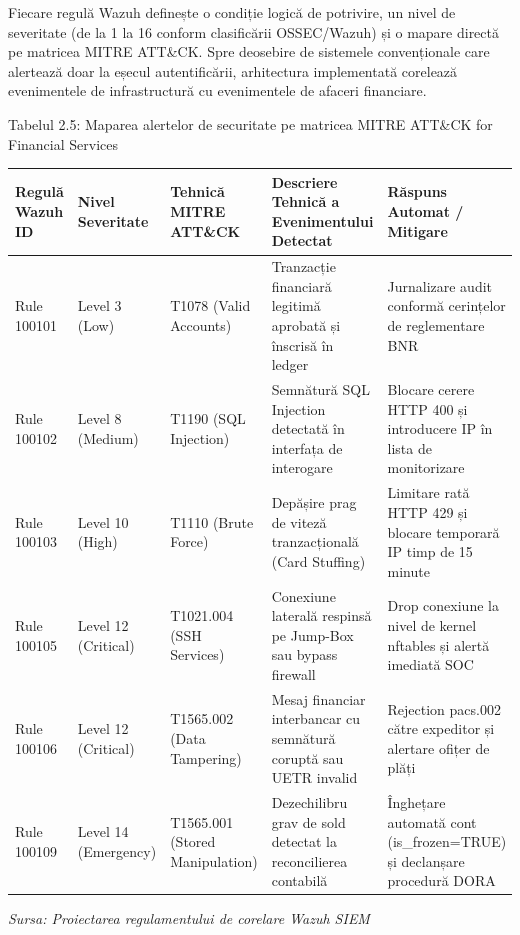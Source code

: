 Fiecare regulă Wazuh definește o condiție logică de potrivire, un nivel de severitate (de la 1 la 16 conform clasificării OSSEC/Wazuh) și o mapare directă pe matricea MITRE ATT\&CK. Spre deosebire de sistemele convenționale care alertează doar la eșecul autentificării, arhitectura implementată corelează evenimentele de infrastructură cu evenimentele de afaceri financiare.

Tabelul 2.5: Maparea alertelor de securitate pe matricea MITRE ATT\&CK for Financial Services

\begin{table}[htbp]
\centering
\small
\begin{tabular}{p{} p{} p{} p{} p{}}
\toprule
Regulă Wazuh ID & Nivel Severitate & Tehnică MITRE ATT\&CK & Descriere Tehnică a Evenimentului Detectat & Răspuns Automat / Mitigare \\
\midrule
Rule 100101 & Level 3 (Low) & T1078 (Valid Accounts) & Tranzacție financiară legitimă aprobată și înscrisă în ledger & Jurnalizare audit conformă cerințelor de reglementare BNR \\
Rule 100102 & Level 8 (Medium) & T1190 (SQL Injection) & Semnătură SQL Injection detectată în interfața de interogare & Blocare cerere HTTP 400 și introducere IP în lista de monitorizare \\
Rule 100103 & Level 10 (High) & T1110 (Brute Force) & Depășire prag de viteză tranzacțională (Card Stuffing) & Limitare rată HTTP 429 și blocare temporară IP timp de 15 minute \\
Rule 100105 & Level 12 (Critical) & T1021.004 (SSH Services) & Conexiune laterală respinsă pe Jump-Box sau bypass firewall & Drop conexiune la nivel de kernel nftables și alertă imediată SOC \\
Rule 100106 & Level 12 (Critical) & T1565.002 (Data Tampering) & Mesaj financiar interbancar cu semnătură coruptă sau UETR invalid & Rejection pacs.002 către expeditor și alertare ofițer de plăți \\
Rule 100109 & Level 14 (Emergency) & T1565.001 (Stored Manipulation) & Dezechilibru grav de sold detectat la reconcilierea contabilă & Înghețare automată cont (is\_frozen=TRUE) și declanșare procedură DORA \\
\bottomrule
\end{tabular}
\end{table}

\textit{Sursa: Proiectarea regulamentului de corelare Wazuh SIEM}

